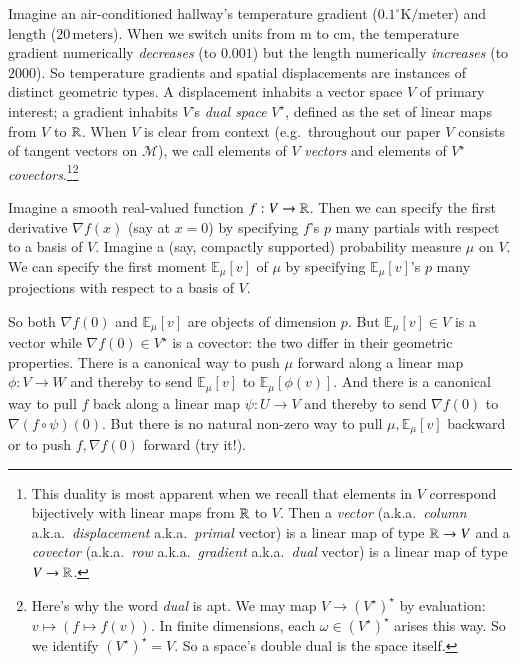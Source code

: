 \documentclass[anon,12pt]{colt2021} %
\newcommand{\expc}{\mathbb{E}}
\newcommand{\Mm}{\mathcal{M}}
\begin{document}
{            Imagine an air-conditioned hallway's temperature gradient
            ($0.1^\circ \text{K}/\text{meter}$) and length
            ($20\,\text{meters}$).  When we switch units from m to cm, the
            temperature gradient numerically \emph{decreases} (to $0.001$) but
            the length numerically \emph{increases} (to $2000$).  So
            temperature gradients and spatial displacements are instances of
            distinct geometric types.  A displacement inhabits a vector
            space $V$ of primary interest; a gradient inhabits $V$'s \emph{dual
            space} $V^\star$, defined as the set of linear maps from $V$ to
            $\mathbb{R}$.  When $V$ is clear from context (e.g.\ throughout our paper
            $V$ consists of tangent vectors on $\Mm$), we call elements of $V$
            \emph{vectors} and elements of $V^\star$ \emph{covectors}.\footnote{
                This duality is most apparent when we
                recall that elements in $V$ correspond bijectively with 
                linear maps from $\mathbb{R}$ to $V$.  Then a
                \emph{vector} (a.k.a.\ \emph{column} a.k.a.\
                \emph{displacement} a.k.a.\ \emph{primal} vector) is a linear
                map of type $\mathbb{R}\to V$ and a \emph{covector} (a.k.a.\
                \emph{row} a.k.a.\ \emph{gradient} a.k.a.\ \emph{dual} vector)
                is a linear map of type $V\to \mathbb{R}$.
            }\footnote{
                Here's why the word \emph{dual} is apt.
                We may map $V \to (V^\star)^\star$ by evaluation: $v
                \mapsto (f \mapsto f(v))$.  In finite dimensions, each 
                $\omega\in (V^\star)^\star$ arises this way.  So we
                identify $(V^\star)^\star = V$.  So a space's double dual is
                the space itself.
            }


            Imagine a smooth real-valued function $f:V\to \mathbb{R}$.  Then 
            we can specify the first derivative $\nabla f(x)$ (say at $x=0$) 
            by specifying $f$'s $p$ many partials with respect to a basis of
            $V$.
            Imagine a (say, compactly supported) probability measure $\mu$ on
            $V$.  We can specify the first moment $\expc_\mu[v]$ of $\mu$ 
            by specifying $\expc_\mu[v]$'s $p$ many projections with respect
            to a basis of $V$.

            So both $\nabla f(0)$ and $\expc_\mu[v]$ are objects of dimension
            $p$.  But $\expc_\mu[v] \in V$ is a vector while $\nabla f(0) \in
            V^\star$ is a covector: the two differ in their geometric
            properties.
            There is a canonical way to push $\mu$ forward along a
            linear map $\phi:V\to W$ and thereby to send $\expc_\mu[v]$ to
            $\expc_\mu[\phi(v)]$.  And there is a canonical way to pull $f$ back
            along a linear map $\psi:U\to V$ and thereby to send $\nabla f(0)$
            to $\nabla (f\circ \psi)(0)$.  But there is no natural non-zero way
            to pull $\mu, \expc_\mu[v]$ backward or to push $f, \nabla f(0)$
            forward (try it!).

}
\end{document}
